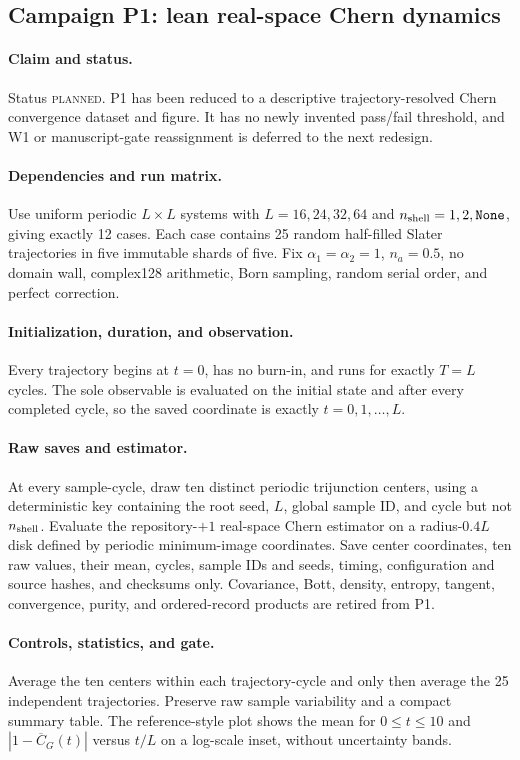 \documentclass[aps,prx,twocolumn,floatfix,nofootinbib,superscriptaddress,longbibliography]{revtex4-2}
\newcommand{\planned}{\textsc{planned}}
\begin{document}
\subsection{Campaign P1: lean real-space Chern dynamics}
\label{camp:P1}
\paragraph*{Claim and status.}
Status \planned.  P1 has been reduced to a descriptive trajectory-resolved Chern
convergence dataset and figure.  It has no newly invented pass/fail threshold, and W1 or
manuscript-gate reassignment is deferred to the next redesign.

\paragraph*{Dependencies and run matrix.}
Use uniform periodic $L\times L$ systems with $L=16,24,32,64$ and
$n_{\rm shell}=1,2,\texttt{None}$, giving exactly 12 cases.  Each case contains 25 random
half-filled Slater trajectories in five immutable shards of five.  Fix
$\alpha_1=\alpha_2=1$, $n_a=0.5$, no domain wall, complex128 arithmetic, Born sampling,
random serial order, and perfect correction.

\paragraph*{Initialization, duration, and observation.}
Every trajectory begins at $t=0$, has no burn-in, and runs for exactly $T=L$ cycles.  The
sole observable is evaluated on the initial state and after every completed cycle, so the
saved coordinate is exactly $t=0,1,\ldots,L$.

\paragraph*{Raw saves and estimator.}
At every sample-cycle, draw ten distinct periodic trijunction centers, using a deterministic
key containing the root seed, $L$, global sample ID, and cycle but not $n_{\rm shell}$.
Evaluate the repository-$+1$ real-space Chern estimator on a radius-$0.4L$ disk defined by
periodic minimum-image coordinates.  Save center coordinates, ten raw values, their mean,
cycles, sample IDs and seeds, timing, configuration and source hashes, and checksums only.
Covariance, Bott, density, entropy, tangent, convergence, purity, and ordered-record
products are retired from P1.

\paragraph*{Controls, statistics, and gate.}
Average the ten centers within each trajectory-cycle and only then average the 25
independent trajectories.  Preserve raw sample variability and a compact summary table.
The reference-style plot shows the mean for $0\leq t\leq10$ and
$|1-\overline C_G(t)|$ versus $t/L$ on a log-scale inset, without uncertainty bands.
\end{document}
